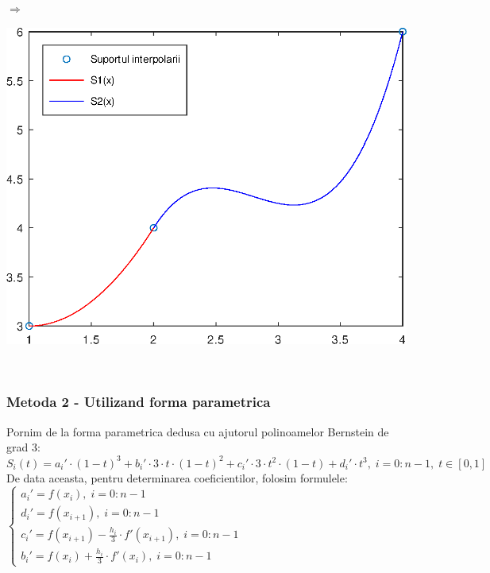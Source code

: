 \documentclass{article}
\begin{document}
$\Longrightarrow$
\begin{minipage}{0.65\textwidth}
\end{minipage}
\begin{minipage}{0.35\textwidth}
    \includegraphics[scale=0.35]{spline_c1_ex}
\end{minipage}\\


\subsubsection{Metoda 2 - Utilizand forma parametrica}

\tab Pornim de la forma parametrica dedusa cu ajutorul polinoamelor Bernstein de grad $3$:\\

$S_i(t) = a_i' \cdot (1-t)^3 + b_i' \cdot 3 \cdot t \cdot (1-t)^2 + c_i' \cdot 3 \cdot t^2 \cdot (1-t) + d_i' \cdot t^3,\; i = 0 : n-1,\; t \in [0, 1]$\\

De data aceasta, pentru determinarea coeficientilor, folosim formulele:\;
$\begin{cases}
  a_i' = f(x_i),\; i = 0 : n-1\\
  d_i' = f(x_{i+1}),\; i = 0 : n-1\\
  c_i' = f(x_{i+1}) - \frac{h_i}{3} \cdot f'(x_{i+1}),\; i = 0 : n-1\\
  b_i' = f(x_i) + \frac{h_i}{3} \cdot f'(x_i),\; i = 0 : n-1
\end{cases}$\\
\end{document}

